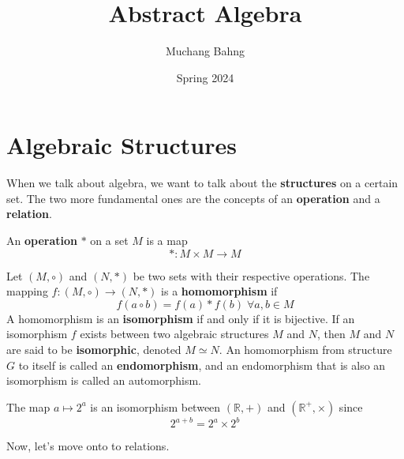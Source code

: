 \documentclass{article}
\begin{document}
\title{Abstract Algebra}
\author{Muchang Bahng}
\date{Spring 2024}

\maketitle
\tableofcontents
\pagebreak

\section{Algebraic Structures}

    When we talk about algebra, we want to talk about the \textbf{structures} on a certain set. The two more fundamental ones are the concepts of an \textbf{operation} and a \textbf{relation}. 

    \begin{definition}[Operation]
      An \textbf{operation} $*$ on a set $M$ is a map 
      \begin{equation}
         \ast : M \times M \longrightarrow M
      \end{equation}
    \end{definition}

    \begin{definition}[Homomorphism]
      Let $(M, \circ)$ and $(N, *)$ be two sets with their respective operations. The mapping $f: (M, \circ) \longrightarrow (N, *)$ is a \textbf{homomorphism} if
      \begin{equation}
        f(a \circ b) = f(a) * f(b) \; \forall a, b \in M
      \end{equation}
      A homomorphism is an \textbf{isomorphism} if and only if it is bijective. If an isomorphism $f$ exists between two algebraic structures $M$ and $N$, then $M$ and $N$ are said to be \textbf{isomorphic}, denoted $M \simeq N$. An homomorphism from structure $G$ to itself is called an \textbf{endomorphism}, and an endomorphism that is also an isomorphism is called an automorphism. 
    \end{definition}

    \begin{example}
      The map $a \mapsto 2^{a}$ is an isomorphism between $(\mathbb{R}, +)$ and $(\mathbb{R}^{+}, \times)$ since 
      \begin{equation}
        2^{a+b} = 2^a \times 2^b
      \end{equation}
    \end{example}

    Now, let's move onto to relations. 
\end{document}
